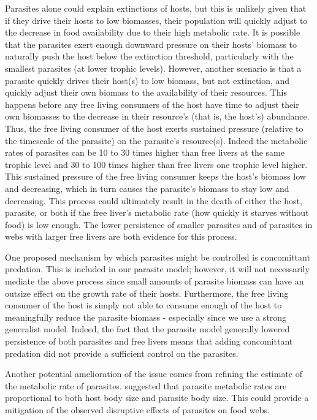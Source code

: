 \documentclass[/home/nkappler/Research/Dissertation/dissertation.tex]{subfiles}
\begin{document}
\begin{bibunit}
Parasites alone could explain extinctions of hosts, but this is unlikely given
that if they drive their hosts to low biomasses, their population will quickly
adjust to the decrease in food availability due to their high metabolic rate.
It is possible that the parasites exert enough downward pressure on their
hosts' biomass to naturally push the host below the extinction threshold,
particularly with the smallest parasites (at lower trophic levels). However,
another scenario is that a parasite quickly drives their host(s) to low
biomass, but not extinction, and quickly adjust their own biomass to the
availability of their resources. This happens before any free living consumers
of the host have time to adjust their own biomasses to the decrease in their
resource's (that is, the host's) abundance. Thus, the free living consumer of
the host exerts sustained pressure (relative to the timescale of the parasite)
on the parasite's resource(s). Indeed the metabolic rates of parasites can be
10 to 30 times higher than free livers at the same trophic level and 30 to 100
times higher than free livers one trophic level higher.  This sustained
pressure of the free living consumer keeps the host's biomass low and
decreasing, which in turn causes the parasite's biomass to stay low and
decreasing. This process could ultimately result in the death of either the
host, parasite, or both if the free liver's metabolic rate (how quickly it
starves without food) is low enough. The lower persistence of smaller parasites
and of parasites in webs with larger free livers are both evidence for this
process. 

One proposed mechanism by which parasites might be controlled is concomittant
predation. This is included in our parasite model; however, it will not
necessarily mediate the above process since small amounts of parasite biomass
can have an outsize effect on the growth rate of their hosts. Furthermore, the
free living consumer of the host is simply not able to consume enough of the
host to meaningfully reduce the parasite biomass - especially since we use a
strong generalist model. Indeed, the fact that the parasite model generally
lowered persistence of both parasites and free livers means that adding
concomittant predation did not provide a sufficient control on the parasites. 

Another potential amelioration of the issue comes from refining the estimate of
the metabolic rate of parasites. \cite{Hechinger2013} suggested that parasite
metabolic rates are proportional to both host body size and parasite body size.
This could provide a mitigation of the observed disruptive effects of parasites
on food webs.


\end{bibunit}
\end{document}
